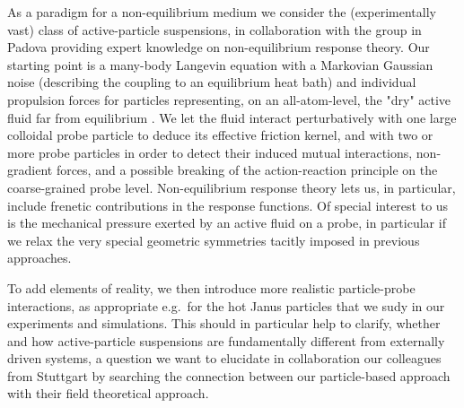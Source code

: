 \begin{workpackage}
\begin{tasklist}

\begin{task}[title=Non-Equilibrium Equations of State (NEOS),id=task1,PM=8,lead=Leipzig,partners={Padova,USTUTT},wphases=0-48!0.5]
As a paradigm for a non-equilibrium medium we consider the (experimentally vast) class of
active-particle suspensions, in collaboration with the group in Padova providing expert knowledge on 
non-equilibrium response theory.
%
Our starting point is a many-body Langevin equation with a Markovian Gaussian noise
(describing the coupling to an equilibrium heat bath) and individual propulsion forces for
particles representing, on an all-atom-level, the "dry" active fluid far from equilibrium \cite{solon-etal.2015}. 
%
We let the fluid interact perturbatively with one large colloidal probe particle to
deduce its effective friction kernel, and with two or more probe particles in order to
detect their induced mutual interactions, non-gradient forces, and a possible breaking of
the action-reaction principle on the coarse-grained probe level.  
%
Non-equilibrium response theory lets us, in particular, include frenetic contributions in the response functions.
%
Of special interest to us is the mechanical pressure exerted by an active fluid on a probe, 
in particular if we relax the very special geometric symmetries tacitly imposed in previous approaches.

To add elements of reality, we then introduce more realistic particle-probe interactions, as appropriate e.g.\ for the hot 
Janus particles that we sudy in our experiments and simulations.
%
This should in particular help to clarify, whether and how active-particle suspensions are fundamentally different
from externally driven systems, a question we want to elucidate in collaboration our colleagues from Stuttgart 
by searching the connection between our particle-based approach with their field theoretical approach.

\end{task}


\end{tasklist}
\end{workpackage}
